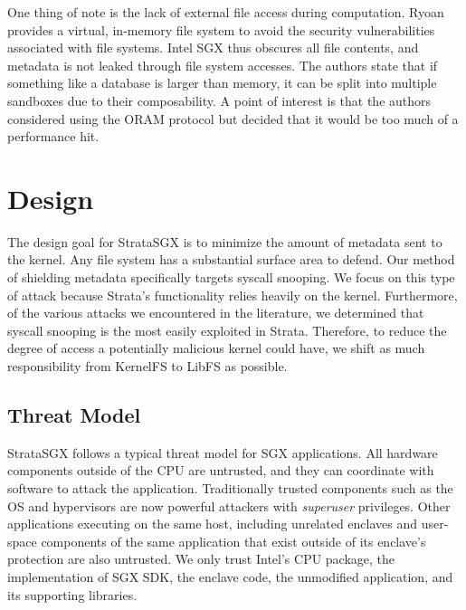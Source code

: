 \documentclass[letterpaper,twocolumn,10pt]{article}
\begin{document}
One thing of note is the lack of external file access during computation.
Ryoan provides a virtual, in-memory file system to avoid the security
vulnerabilities associated with file systems. Intel SGX thus obscures all file
contents, and metadata is not leaked through file system accesses. The authors
state that if something like a database is larger than memory, it can be split
into multiple sandboxes due to their composability. A point of interest is that
the authors considered using the ORAM protocol but decided that it would be too
much of a performance hit.




\section{Design}

The design goal for StrataSGX is to minimize the amount of metadata sent to the
kernel. Any file system has a substantial surface area to defend. Our
method of shielding metadata specifically targets syscall snooping. We focus on
this type of attack because Strata's functionality relies heavily on the
kernel. Furthermore, of the various attacks we encountered in the literature,
we determined that syscall snooping is the most easily exploited in Strata.
Therefore, to reduce the degree of access a potentially malicious kernel could
have, we shift as much responsibility from KernelFS to LibFS as possible.

\subsection{Threat Model}

StrataSGX follows a typical threat model for SGX applications. All
hardware components outside of the CPU are untrusted, and they can coordinate with
software to attack the application. Traditionally trusted components such
as the OS and hypervisors are now powerful attackers with \emph{superuser}
privileges. Other applications executing on the same host, including unrelated
enclaves and user-space components of the same application that exist outside of
its enclave's protection are also untrusted. We only trust Intel's CPU package,
the implementation of SGX SDK, the enclave code, %
the unmodified application, and its supporting libraries.
\end{document}

